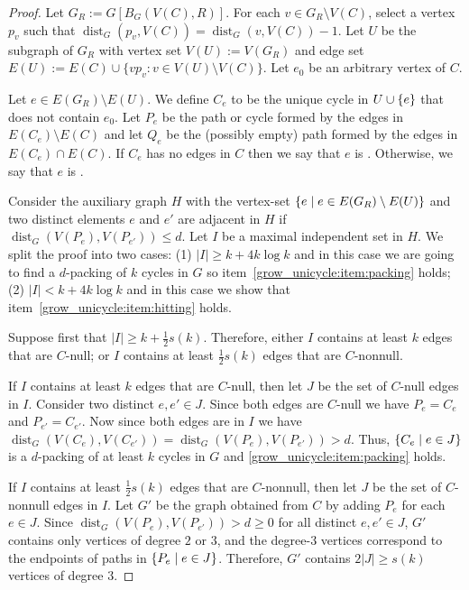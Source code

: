 \documentclass{patmorin}
\DeclareMathOperator{\dist}{dist}
\DeclarePairedDelimiter\set{\{}{\}}
\begin{document}
\begin{proof}
  Let $G_{R}:=G[B_G(V(C),R)]$.
  For each $v\in G_{R}\setminus V(C)$, select a vertex $p_v$ 
  such that $\dist_G(p_v,V(C))=\dist_G(v,V(C))-1$.
  Let $U$ 
  be the subgraph of $G_{R}$ with vertex set $V(U):=V(G_{R})$ and edge set $E(U):=E(C)\cup\{vp_v:v\in V(U)\setminus V(C)\}$.  Let $e_0$ be an arbitrary vertex of $C$.  

  Let $e\in E(G_{R})\setminus E(U)$.
  We define $C_e$ to be the unique cycle in $U\cup \set{e}$ that does not contain $e_0$.
  Let $P_{e}$ be the path or cycle formed by the edges in $E(C_{e})\setminus E(C)$ and let $Q_{e}$ be the (possibly empty) path formed by the edges in $E(C_{e})\cap E(C)$.  
  If $C_e$ has no edges in $C$ then we say that $e$ is .
  Otherwise, we say that $e$ is .
  
  Consider the auxiliary graph $H$ with the vertex-set $\set{e\mid e\in E(G_{R})\setminus E(U)}$ and two distinct elements $e$ and $e'$ are adjacent in $H$ if $\dist_G(V(P_{e}),V(P_{e'})) \le d$.  Let $I$ be a maximal independent set in $H$. 
  We split the proof into two cases: 
  (1) $|I|\ge k+4k\log k$ and in this case we are going to find a $d$-packing of $k$ cycles in $G$ so item~\cref{grow_unicycle:item:packing} holds;
  (2) $|I|< k+4k\log k$ and in this case we show that item~\cref{grow_unicycle:item:hitting} holds.

  
  Suppose first that $|I|\ge k+\frac{1}{2}s(k)$.
  Therefore,
  either $I$ contains at least $k$ edges that are $C$-null;
  or $I$ contains at least $\frac{1}{2}s(k)$ edges that are $C$-nonnull.

  If $I$ contains at least $k$ edges that are $C$-null, then let $J$ be the set of $C$-null edges in $I$.
  Consider two distinct $e,e'\in J$.
  Since both edges are $C$-null we have $P_e=C_e$ and $P_{e'}=C_{e'}$.
  Now since both edges are in $I$ we have $\dist_G(V(C_e),V(C_{e'}))=\dist_G(V(P_e),V(P_{e'}))>d$. 
  Thus, $\set{C_e \mid e\in J}$ is a $d$-packing of at least $k$ cycles in $G$ and \eqref{grow_unicycle:item:packing} holds.  
  
  If $I$ contains at least $\frac{1}{2}s(k)$ edges that are $C$-nonnull, then let $J$ be the set of $C$-nonnull edges in $I$.
  Let $G'$ be the graph obtained from $C$ by adding $P_e$ for each $e\in J$.
  Since $\dist_G(V(P_e),V(P_{e'}))>d\ge0$ for all distinct $e,e'\in J$, $G'$ contains only vertices of degree $2$ or $3$, and the degree-$3$ vertices correspond to the endpoints of paths in $\set{P_e \mid e\in J}$.
  Therefore, $G'$ contains $2|J|\geq s(k)$ vertices of degree $3$.
  

\end{proof}
\end{document}
